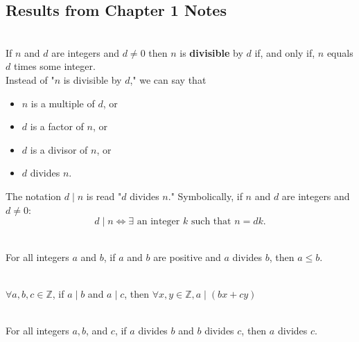 \documentclass[12pt]{article}
\begin{document}
\subsection{Results from Chapter 1 Notes}
\begin{definition}[Divisibility]
\hfill\\
\normalfont If $n$ and $d$ are integers and $d\neq 0$ then $n$ is \textbf{divisible} by $d$ if, and only if, $n$ equals $d$ times some integer.\\
Instead of "$n$ is divisible by $d$," we can say that\\
\vspace{-5mm}
\begin{itemize}
\itemsep0em
\item[] $n$ is a multiple of $d$, or
\item[] $d$ is a factor of $n$, or
\item[] $d$ is a divisor of $n$, or
\item[] $d$ divides $n$.
\end{itemize}
The notation $d \mid n$ is read "$d$ divides $n$." Symbolically, if $n$ and $d$ are integers and $d\neq0$:
\[
d \mid n \Leftrightarrow \exists \text{ an integer }k \text{ such that } n = dk.
\]
\end{definition}
\begin{theorem}[4.3.1(Epp)]
\hfill\\
\normalfont For all integers $a$ and $b$, if $a$ and $b$ are positive and $a$ divides $b$, then $a \leq b$.
\end{theorem}
\begin{theorem}[4.1.1]
\hfill\\
\normalfont $\forall a, b, c\in \mathbb{Z}$, if $a\mid b$ and $a \mid c$, then $\forall x,y\in\mathbb{Z}, a\mid(bx+cy)$
\end{theorem}
\begin{theorem}[4.3.3(Epp)]
\hfill\\
\normalfont For all integers $a, b$, and $c$, if $a$ divides $b$ and $b$ divides $c$, then $a$ divides $c$.
\end{theorem}
\end{document}
